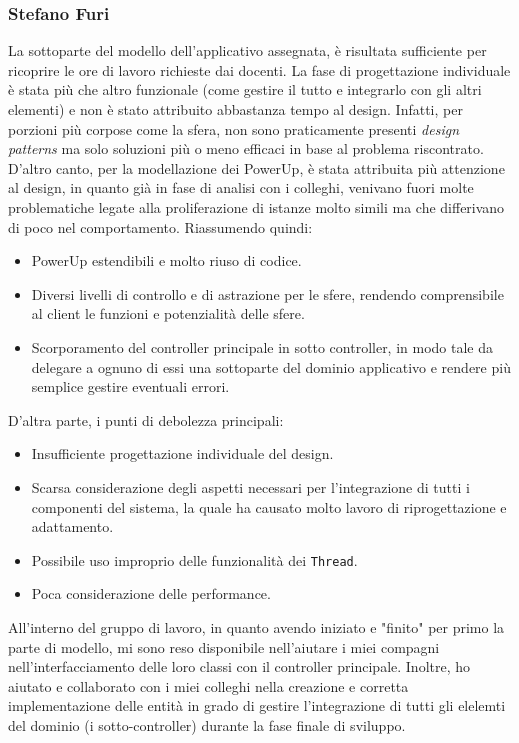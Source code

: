 \documentclass[a4paper,12pt]{report}
\begin{document}
\subsubsection{Stefano Furi}
La sottoparte del modello dell'applicativo assegnata, è risultata sufficiente per ricoprire le ore di lavoro richieste dai docenti. La fase di progettazione individuale è stata più che altro funzionale (come gestire il tutto e integrarlo con gli altri elementi) e non è stato attribuito abbastanza tempo al design. Infatti, per porzioni più corpose come la sfera, non sono praticamente presenti \emph{design patterns} ma solo soluzioni più o meno efficaci in base al problema riscontrato. D'altro canto, per la modellazione dei PowerUp, è stata attribuita più attenzione al design, in quanto già in fase di analisi con i colleghi, venivano fuori molte problematiche legate alla proliferazione di istanze molto simili ma che differivano di poco nel comportamento. Riassumendo quindi:
\begin{itemize}
    \item PowerUp estendibili e molto riuso di codice.
    \item Diversi livelli di controllo e di astrazione per le sfere, rendendo comprensibile al client le funzioni e potenzialità delle sfere.
    \item Scorporamento del controller principale in sotto controller, in modo tale da delegare a ognuno di essi una sottoparte del dominio applicativo e rendere più semplice gestire eventuali errori.
\end{itemize}
D'altra parte, i punti di debolezza principali:
\begin{itemize}
    \item Insufficiente progettazione individuale del design.
    \item Scarsa considerazione degli aspetti necessari per l'integrazione di tutti i componenti del sistema, la quale ha causato molto lavoro di riprogettazione e adattamento.
    \item Possibile uso improprio delle funzionalità dei \texttt{Thread}.
    \item Poca considerazione delle performance. 
\end{itemize}
All'interno del gruppo di lavoro, in quanto avendo iniziato e "finito" per primo la parte di modello, mi sono reso disponibile nell'aiutare i miei compagni nell'interfacciamento delle loro classi con il controller principale. Inoltre, ho aiutato e collaborato con i miei colleghi nella creazione e corretta implementazione delle entità in grado di gestire l'integrazione di tutti gli elelemti del dominio (i sotto-controller) durante la fase finale di sviluppo.
\end{document}
